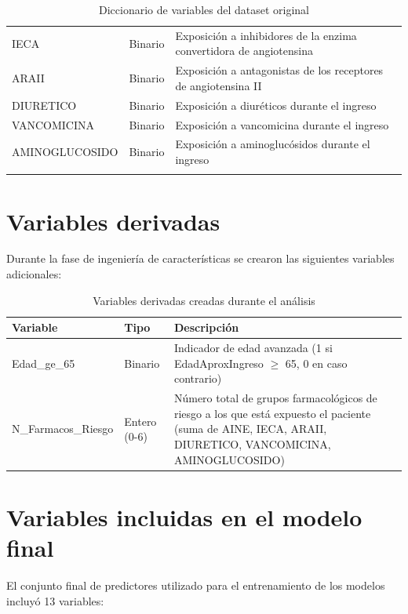 \documentclass[12pt, a4paper, oneside]{report}
\begin{document}
\begin{longtable}{p{4cm}p{2.5cm}p{7cm}}
IECA & Binario & Exposición a inhibidores de la enzima convertidora de angiotensina \\
ARAII & Binario & Exposición a antagonistas de los receptores de angiotensina II \\
DIURETICO & Binario & Exposición a diuréticos durante el ingreso \\
VANCOMICINA & Binario & Exposición a vancomicina durante el ingreso \\
AMINOGLUCOSIDO & Binario & Exposición a aminoglucósidos durante el ingreso \\
\hline
\caption{Diccionario de variables del dataset original}
\label{tab:diccionario_original}
\end{longtable}

\section{Variables derivadas}

Durante la fase de ingeniería de características se crearon las siguientes variables adicionales:

\begin{table}[h]
\centering
\begin{tabular}{p{4cm}p{2.5cm}p{7cm}}
\hline
\textbf{Variable} & \textbf{Tipo} & \textbf{Descripción} \\
\hline
Edad\_ge\_65 & Binario & Indicador de edad avanzada (1 si EdadAproxIngreso $\geq$ 65, 0 en caso contrario) \\
N\_Farmacos\_Riesgo & Entero (0-6) & Número total de grupos farmacológicos de riesgo a los que está expuesto el paciente (suma de AINE, IECA, ARAII, DIURETICO, VANCOMICINA, AMINOGLUCOSIDO) \\
\hline
\end{tabular}
\caption{Variables derivadas creadas durante el análisis}
\label{tab:variables_derivadas}
\end{table}

\section{Variables incluidas en el modelo final}

El conjunto final de predictores utilizado para el entrenamiento de los modelos incluyó 13 variables:
\end{document}
